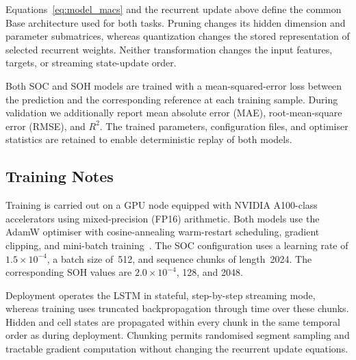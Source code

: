 \documentclass[final,3p,times]{elsarticle}
\begin{document}
Equations~\eqref{eq:model_macs} and the recurrent update above define the common Base architecture used for both tasks. Pruning changes its hidden dimension and parameter submatrices, whereas quantization changes the stored representation of selected recurrent weights. Neither transformation changes the input features, targets, or streaming state-update order.

Both SOC and SOH models are trained with a mean-squared-error loss between the prediction and the corresponding reference at each training sample. During validation we additionally report mean absolute error (MAE), root-mean-square error (RMSE), and $R^2$. The trained parameters, configuration files, and optimiser statistics are retained to enable deterministic replay of both models.
\subsection{Training Notes}
Training is carried out on a GPU node equipped with NVIDIA A100-class accelerators using mixed-precision (FP16) arithmetic. Both models use the AdamW optimiser with cosine-annealing warm-restart scheduling, gradient clipping, and mini-batch training~\cite{loshchilovDecoupledWeightDecay2017,loshchilovSGDRStochasticGradient2016,micikeviciusMixedPrecisionTraining2017,pascanuDifficultyTrainingRecurrent2012}. The SOC configuration uses a learning rate of $1.5\times10^{-4}$, a batch size of~512, and sequence chunks of length~2024. The corresponding SOH values are $2.0\times10^{-4}$, 128, and 2048.

Deployment operates the LSTM in stateful, step-by-step streaming mode, whereas training uses truncated backpropagation through time over these chunks. Hidden and cell states are propagated within every chunk in the same temporal order as during deployment. Chunking permits randomised segment sampling and tractable gradient computation without changing the recurrent update equations.
\end{document}
